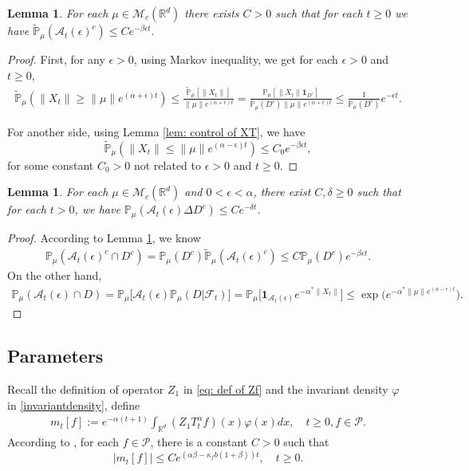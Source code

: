 \documentclass[12pt,oneside,english]{amsart}
\theoremstyle{plain}
\newtheorem{lem}[thm]{Lemma}
\theoremstyle{definition}
\numberwithin{equation}{section}
\newcommand{\added}[1]{{\color{blue}#1}}\newcommand{\deleted}[1]{{\color{red}#1}}
\begin{document}
\begin{lem}\label{lem: control of AT}
  For each $\mu \in \mathcal{M}_c(\mathbb{R}^d)$ there exists $C>0$ such that for each $t\geq 0$ we have
  $
  \mathbb{\tilde{P}}_{\mu}\left(\mathcal{A}_t(\epsilon)^c\right)\leq C e^{-\beta\epsilon t}.
  $
\end{lem}

\begin{proof}
    First, for any $\epsilon>0$, using Markov inequality, we get for each $\epsilon>0$ and $t\geq 0$,
\begin{align}
    \mathbb{\tilde{P}}_{\mu}(\|X_t\|\geq\|\mu\|e^{(\alpha+\epsilon)t})
    \leq\frac{\mathbb{\tilde{P}}_{\mu}[\|X_t\|]}{\|\mu\|e^{(\alpha+\epsilon)t}}
	= \frac{\mathbb P_\mu[\|X_t\|\mathbf 1_{D^c}]}{\mathbb P_\mu(D^c)\|\mu\|e^{(\alpha+\epsilon)t}}
    \leq \frac{1}{\mathbb{P}_{\mu}(D^c)}e^{-\epsilon t}.
\end{align}

    For another side, using Lemma \ref{lem: control of XT}, we have
    $$\mathbb{\tilde{P}}_{\mu}\left(\|X_t\|\leq \|\mu\|e^{(\alpha-\epsilon)t}\right)\leq C_0 e^{-\beta\epsilon t}, $$
     for some constant $C_0>0$ not related to $\epsilon>0$ and $t\geq 0$.
\end{proof}
\added{
\begin{lem}\label{lem: control of A&D}
For each $\mu\in \mathcal{M}_c(\mathbb{R}^d)$ and $0<\epsilon<\alpha$, there exist $C,\delta\geq 0$ such that for each $t>0$, we have $\mathbb{P}_{\mu}(\mathcal{A}_t(\epsilon)\Delta D^c)\leq Ce^{-\delta t}$.
\end{lem}
\begin{proof}
    According to Lemma \ref{lem: control of AT}, we know
    \begin{align}
            \mathbb{P}_{\mu}(\mathcal{A}_t(\epsilon)^c\cap D^c)=\mathbb{P}_{\mu}(D^c)\mathbb{\tilde{P}}_{\mu}(\mathcal{A}_t(\epsilon)^c)\leq C\mathbb{P}_{\mu}(D^c)e^{-\beta \epsilon t}.
    \end{align}
    On the other hand,
    \begin{align}
        \mathbb{P}_{\mu}(\mathcal{A}_t(\epsilon)\cap D)=\mathbb{P}_{\mu}\big[\mathcal{A}_t(\epsilon)\mathbb{P}_{\mu}(D|\mathscr{F}_t)\big]=\mathbb{P}_{\mu}\big[\mathbf{1}_{\mathcal{A}_t(\epsilon)}e^{-\alpha^* \|X_t\|}\big]\leq \exp\big(e^{-\alpha^*\|\mu\|e^{(\alpha-\epsilon)t}}\big).
    \end{align}
\end{proof}
}
\subsection{Parameters}
 Recall the definition of operator $Z_1$ in \eqref{eq: def of Zf} and the invariant density $\varphi$ in \eqref{invariantdensity}, define
 \begin{align}\label{parameter_mk}
      m_t[f]:=e^{-\alpha (t+1)}\int_{\mathbb R^d} (Z_1T_t^{\alpha}f)(x)\varphi(x)dx,\quad t\geq 0, f\in \mathcal P.
 \end{align}
According to \cite[Lemma 2.7]{MM}, for each $f\in\mathcal{P}$, there is a constant $C>0$ such that
\[
    |m_t[f]|
    \leq C e^{(\alpha\beta-\kappa_fb(1+\beta))t},
    \quad t\geq 0.
\]
\end{document}
